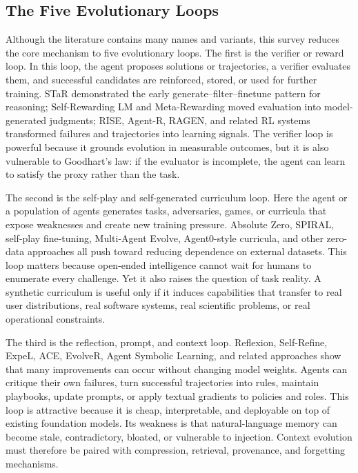 \subsection{The Five Evolutionary Loops}

Although the literature contains many names and variants, this survey reduces the core mechanism to five evolutionary loops. The first is the verifier or reward loop. In this loop, the agent proposes solutions or trajectories, a verifier evaluates them, and successful candidates are reinforced, stored, or used for further training. STaR demonstrated the early generate--filter--finetune pattern for reasoning; Self-Rewarding LM and Meta-Rewarding moved evaluation into model-generated judgments; RISE, Agent-R, RAGEN, and related RL systems transformed failures and trajectories into learning signals. The verifier loop is powerful because it grounds evolution in measurable outcomes, but it is also vulnerable to Goodhart's law: if the evaluator is incomplete, the agent can learn to satisfy the proxy rather than the task.

The second is the self-play and self-generated curriculum loop. Here the agent or a population of agents generates tasks, adversaries, games, or curricula that expose weaknesses and create new training pressure. Absolute Zero, SPIRAL, self-play fine-tuning, Multi-Agent Evolve, Agent0-style curricula, and other zero-data approaches all push toward reducing dependence on external datasets. This loop matters because open-ended intelligence cannot wait for humans to enumerate every challenge. Yet it also raises the question of task reality. A synthetic curriculum is useful only if it induces capabilities that transfer to real user distributions, real software systems, real scientific problems, or real operational constraints.

The third is the reflection, prompt, and context loop. Reflexion, Self-Refine, ExpeL, ACE, EvolveR, Agent Symbolic Learning, and related approaches show that many improvements can occur without changing model weights. Agents can critique their own failures, turn successful trajectories into rules, maintain playbooks, update prompts, or apply textual gradients to policies and roles. This loop is attractive because it is cheap, interpretable, and deployable on top of existing foundation models. Its weakness is that natural-language memory can become stale, contradictory, bloated, or vulnerable to injection. Context evolution must therefore be paired with compression, retrieval, provenance, and forgetting mechanisms.


